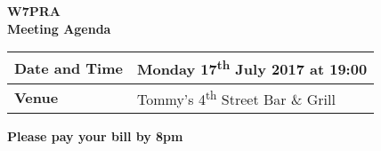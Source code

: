 \documentclass[letter,11pt]{extarticle}
\begin{document}
	\thispagestyle{empty}
	
	\begin{center}
		\textbf{W7PRA\\Meeting Agenda}
		\vspace{0.33cm}
	\end{center}
	
	\begin{center}
		\begin{tabular}{| m{3.0cm} | m{7.5cm} |} \hline
			\textbf{Date and Time} & Monday 17\textsuperscript{th} July 2017 at 19:00 \\ \hline
			\textbf{Venue} & Tommy's 4\textsuperscript{th} Street Bar \& Grill \\ \hline
				\end{tabular}
	\end{center}
	
	\begin{center}
		\textbf{Please pay your bill by 8pm}
	\end{center}
	
\end{document}
